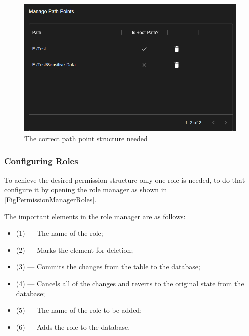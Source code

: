 \begin{figure}[htbp]
	\centering
		\includegraphics[scale=0.65]{./figures/chapter4/permission_manager_correct_path_points.png}
	\caption{The correct path point structure needed}
	\label{FigPermissionManagerPathPointsCorrect}
\end{figure}

\subsubsection{Configuring Roles}
To achieve the desired permission structure only one role is needed, to do that configure it by opening the role manager as shown in \ref{FigPermissionManagerRoles}.

The important elements in the role manager are as follows:
\begin{itemize}
	\item (1) --- The name of the role;
	\item (2) --- Marks the element for deletion;
	\item (3) --- Commits the changes from the table to the database;
	\item (4) --- Cancels all of the changes and reverts to the original state from the database;
	\item (5) --- The name of the role to be added;
	\item (6) --- Adds the role to the database.
\end{itemize}

